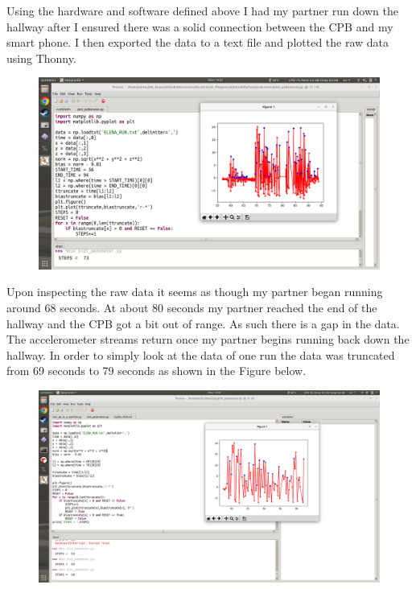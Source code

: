 Using the hardware and software defined above I had my partner run down the hallway after I ensured there was a solid connection between the CPB and my smart phone. I then exported the data to a text file and plotted the raw data using Thonny. 
\begin{figure}[H]
  \begin{center}
    \includegraphics[width=\textwidth]{Figures/Pedometer3.png}
  \end{center}
\end{figure}
Upon inspecting the raw data it seems as though my partner began running around 68 seconds. At about 80 seconds my partner reached the end of the hallway and the CPB got a bit out of range. As such there is a gap in the data. The accelerometer streams return once my partner begins running back down the hallway. In order to simply look at the data of one run the data was truncated from 69 seconds to 79 seconds as shown in the Figure below.
\begin{figure}[H]
  \begin{center}
    \includegraphics[width=\textwidth]{Figures/Pedometer2.png}
  \end{center}
\end{figure}
